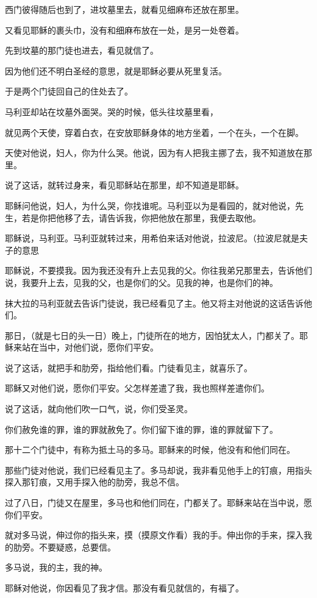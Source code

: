 \documentclass[12pt,oneside]{book}
\begin{document}
西门彼得随后也到了，进坟墓里去，就看见细麻布还放在那里。

又看见耶稣的裹头巾，没有和细麻布放在一处，是另一处卷着。

先到坟墓的那门徒也进去，看见就信了。

因为他们还不明白圣经的意思，就是耶稣必要从死里复活。

于是两个门徒回自己的住处去了。

马利亚却站在坟墓外面哭。哭的时候，低头往坟墓里看，

就见两个天使，穿着白衣，在安放耶稣身体的地方坐着，一个在头，一个在脚。

天使对他说，妇人，你为什么哭。他说，因为有人把我主挪了去，我不知道放在那里。

说了这话，就转过身来，看见耶稣站在那里，却不知道是耶稣。

耶稣问他说，妇人，为什么哭，你找谁呢。马利亚以为是看园的，就对他说，先生，若是你把他移了去，请告诉我，你把他放在那里，我便去取他。

耶稣说，马利亚。马利亚就转过来，用希伯来话对他说，拉波尼。（拉波尼就是夫子的意思

耶稣说，不要摸我。因为我还没有升上去见我的父。你往我弟兄那里去，告诉他们说，我要升上去，见我的父，也是你们的父。见我的神，也是你们的神。

抹大拉的马利亚就去告诉门徒说，我已经看见了主。他又将主对他说的这话告诉他们。

那日，（就是七日的头一日）晚上，门徒所在的地方，因怕犹太人，门都关了。耶稣来站在当中，对他们说，愿你们平安。

说了这话，就把手和肋旁，指给他们看。门徒看见主，就喜乐了。

耶稣又对他们说，愿你们平安。父怎样差遣了我，我也照样差遣你们。

说了这话，就向他们吹一口气，说，你们受圣灵。

你们赦免谁的罪，谁的罪就赦免了。你们留下谁的罪，谁的罪就留下了。

那十二个门徒中，有称为抵土马的多马。耶稣来的时候，他没有和他们同在。

那些门徒对他说，我们已经看见主了。多马却说，我非看见他手上的钉痕，用指头探入那钉痕，又用手探入他的肋旁，我总不信。

过了八日，门徒又在屋里，多马也和他们同在，门都关了。耶稣来站在当中说，愿你们平安。

就对多马说，伸过你的指头来，摸（摸原文作看）我的手。伸出你的手来，探入我的肋旁。不要疑惑，总要信。

多马说，我的主，我的神。

耶稣对他说，你因看见了我才信。那没有看见就信的，有福了。
\end{document}
